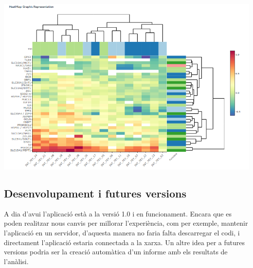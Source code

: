 \documentclass[english]{article}
\begin{document}
\begin{center}
\includegraphics[scale=0.6]{app6.png}
\end{center}
\clearpage
\twocolumn
\subsection{Desenvolupament i futures versions}
A dia d'avui l'aplicació està a la versió 1.0 i en funcionament. Encara que es poden realitzar nous canvis per millorar l'experiència, com per exemple, mantenir l'aplicació en un servidor, d'aquesta manera no faria falta descarregar el codi, i directament l'aplicació estaria connectada a la xarxa. Un altre idea per a futures versions podria ser la creació automàtica d'un informe amb els resultats de l'anàlisi.
\\
\end{document}
